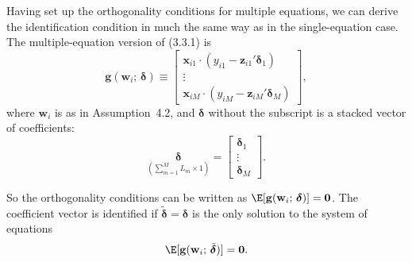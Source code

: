 Having set up the orthogonality conditions for multiple equations, we can derive
the identification condition in much the same way as in the single-equation case.
The multiple-equation version of (3.3.1) is
\begin{equation}
\mathbf{g}(\mathbf{w}_i;\, \boldsymbol{\delta})
\equiv \begin{bmatrix}
\mathbf{x}_{i1} \cdot (y_{i1} - \mathbf{z}_{i1}' \boldsymbol{\delta}_1) \\
\vdots \\
\mathbf{x}_{iM} \cdot (y_{iM} - \mathbf{z}_{iM}' \boldsymbol{\delta}_M)
\end{bmatrix},
\label{eq:4.1.5}
\end{equation}
where $\mathbf{w}_i$ is as in Assumption~4.2, and $\boldsymbol{\delta}$ without the subscript
is a stacked vector of coefficients:
\begin{equation}
\underset{(\sum_{m=1}^{M} L_m \times 1)}{\boldsymbol{\delta}}
= \begin{bmatrix} \boldsymbol{\delta}_1 \\ \vdots \\ \boldsymbol{\delta}_M \end{bmatrix}.
\label{eq:4.1.6}
\end{equation}

So the orthogonality conditions can be written as
$\E[\mathbf{g}(\mathbf{w}_i;\, \boldsymbol{\delta})] = \mathbf{0}$.
The coefficient vector is identified if $\tilde{\boldsymbol{\delta}} = \boldsymbol{\delta}$
is the only solution to the system of equations
\begin{equation}
\E[\mathbf{g}(\mathbf{w}_i;\, \tilde{\boldsymbol{\delta}})] = \mathbf{0}.
\label{eq:4.1.7}
\end{equation}

